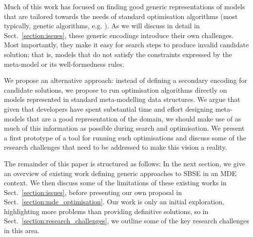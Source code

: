 	Much of this work has focused on finding good generic representations of models that are tailored towards the needs of standard optimisation algorithms (most
	typically, genetic algorithms, e.g. \cite{Deb+02}). As we will discuss in detail in Sect.~\ref{section:issues}, these generic encodings introduce their own
	challenges. Most importantly, they make it easy for search steps to produce invalid candidate solution; that is, models that do not satisfy the constraints
	expressed by the meta-model or its well-formedness rules.
	
	We propose an alternative approach: instead of defining a secondary encoding for candidate solutions, we propose to run optimisation algorithms
	directly on models represented in standard meta-modelling data structures. We argue that given that developers have spent substantial time and effort designing
	meta-models that are a good representation of the domain, we should make use of as much of this information as possible during search and optimisation. We
	present a first prototype of a tool for running such optimisations and discuss some of the research challenges that need to be addressed to make this vision a
	reality.
	
	The remainder of this paper is structured as follows: In the next section, we give an overview of existing work defining generic approaches to SBSE in an MDE
	context. We then discuss some of the limitations of these existing works in Sect.~\ref{section:issues}, before presenting our own proposal in 
	Sect.~\ref{section:mde_optimisation}. Our work is only an initial exploration, highlighting more problems than providing definitive solutions, so in 
	Sect.~\ref{section:research_challenges}, we outline some of the key research challenges in this area.